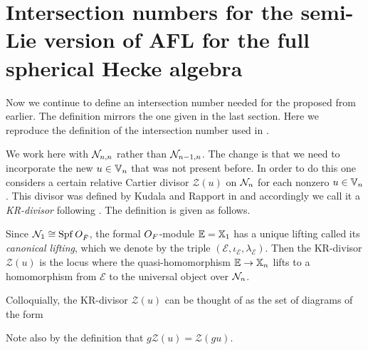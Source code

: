 \section{Intersection numbers for the semi-Lie version of AFL for the full spherical Hecke algebra}
Now we continue to define an intersection number needed for the proposed
 from earlier.
The definition mirrors the one given in the last section.
Here we reproduce the definition of the intersection number used in .

We work here with $\mathcal N_{n,n}$ rather than $\mathcal N_{n-1,n}$.
The change is that we need to incorporate the new $u \in \mathbb V_n$ that was not present before.
In order to do this one considers a certain relative Cartier divisor $\mathcal Z(u)$
on $\mathcal N_n$ for each nonzero $u \in \mathbb V_n$.
This divisor was defined by Kudala and Rapport in \cite{ref:KR}
and accordingly we call it a \emph{KR-divisor} following \cite[\S4.3]{ref:survey}.
The definition is given as follows.
\begin{definition}
  Since $\mathcal N_1 \cong \operatorname{Spf} O_{\breve F}$, the formal $O_F$-module $\mathbb E = \mathbb X_1$
  has a unique lifting called its \emph{canonical lifting}, which we
  denote by the triple $(\mathcal{E}, \iota_{\mathcal{E}}, \lambda_{\mathcal E})$.
  Then the KR-divisor $\mathcal Z(u)$ is the locus where the quasi-homomorphism
  $\mathbb E \to \mathbb X_n$ lifts to a homomorphism from $\mathcal{E}$ to the universal object over $\mathcal N_n$.
\end{definition}
Colloquially, the KR-divisor $\mathcal Z(u)$ can be thought of as the set of diagrams of the form
\begin{center}
\end{center}
Note also by the definition that $g \mathcal Z(u) = \mathcal Z (gu)$.

